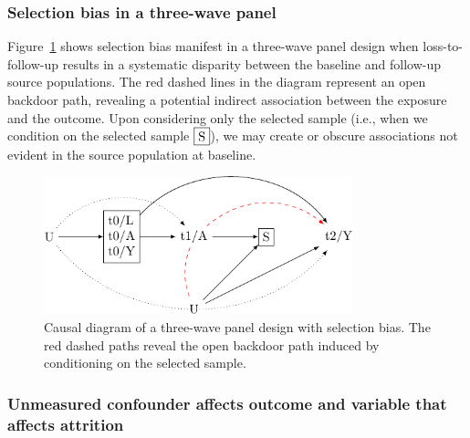 \documentclass[
  singlecolumn]{article}
\begin{document}
\hypertarget{selection-bias-in-a-three-wave-panel}{%
\subsubsection{Selection bias in a three-wave
panel}\label{selection-bias-in-a-three-wave-panel}}

Figure~\ref{fig-dag-8} shows selection bias manifest in a three-wave
panel design when loss-to-follow-up results in a systematic disparity
between the baseline and follow-up source populations. The red dashed
lines in the diagram represent an open backdoor path, revealing a
potential indirect association between the exposure and the outcome.
Upon considering only the selected sample (i.e., when we condition on
the selected sample \(\framebox{S}\)), we may create or obscure
associations not evident in the source population at baseline.

\begin{figure}

{\centering \includegraphics[width=0.8\textwidth,height=\textheight]{causal-dags_files/figure-pdf/fig-dag-8-1.pdf}

}

\caption{\label{fig-dag-8}Causal diagram of a three-wave panel design
with selection bias. The red dashed paths reveal the open backdoor path
induced by conditioning on the selected sample.}

\end{figure}

\hypertarget{unmeasured-confounder-affects-outcome-and-variable-that-affects-attrition}{%
\subsubsection{Unmeasured confounder affects outcome and variable that
affects
attrition}\label{unmeasured-confounder-affects-outcome-and-variable-that-affects-attrition}}
\end{document}
